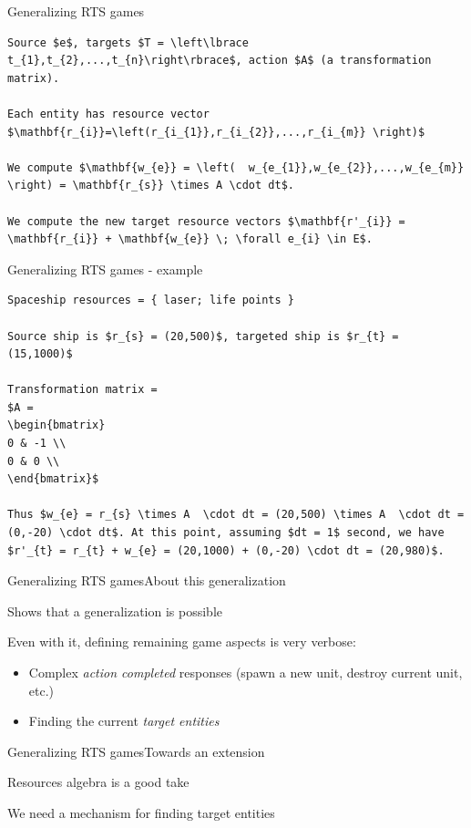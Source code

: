 \documentclass{beamer}
\begin{document}
\begin{frame}[fragile]{Generalizing RTS games}
\begin{lstlisting}
Source $e$, targets $T = \left\lbrace t_{1},t_{2},...,t_{n}\right\rbrace$, action $A$ (a transformation matrix).

Each entity has resource vector $\mathbf{r_{i}}=\left(r_{i_{1}},r_{i_{2}},...,r_{i_{m}} \right)$

We compute $\mathbf{w_{e}} = \left(  w_{e_{1}},w_{e_{2}},...,w_{e_{m}} \right) = \mathbf{r_{s}} \times A \cdot dt$. 

We compute the new target resource vectors $\mathbf{r'_{i}} = \mathbf{r_{i}} + \mathbf{w_{e}} \; \forall e_{i} \in E$.
\end{lstlisting}
\end{frame}

\begin{frame}[fragile]{Generalizing RTS games - example}
\begin{lstlisting}
Spaceship resources = { laser; life points }

Source ship is $r_{s} = (20,500)$, targeted ship is $r_{t} = (15,1000)$

Transformation matrix =
$A =
\begin{bmatrix}
0 & -1 \\
0 & 0 \\
\end{bmatrix}$

Thus $w_{e} = r_{s} \times A  \cdot dt = (20,500) \times A  \cdot dt = (0,-20) \cdot dt$. At this point, assuming $dt = 1$ second, we have $r'_{t} = r_{t} + w_{e} = (20,1000) + (0,-20) \cdot dt = (20,980)$.
\end{lstlisting}
\end{frame}

\begin{slide}{Generalizing RTS games}{About this generalization}{
\item Shows that a generalization is possible
\item Even with it, defining remaining game aspects is very verbose:
\begin{itemize}
\item Complex \textit{action completed} responses (spawn a new unit, destroy current unit, etc.)
\item Finding the current \textit{target entities}
\end{itemize}
}\end{slide}

\begin{slide}{Generalizing RTS games}{Towards an extension}{
\item Resources algebra is a good take
\item We need a mechanism for finding target entities
}\end{slide}
\end{document}
